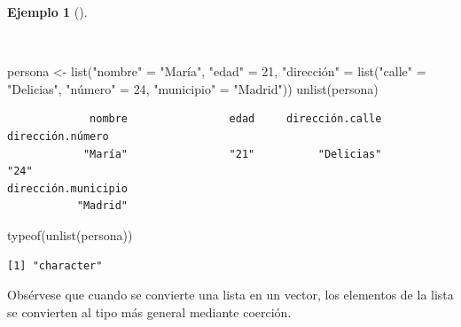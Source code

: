 \documentclass[
  a4paper,
]{scrreport}
\newenvironment{Shaded}{\begin{snugshade}}{\end{snugshade}}
\newcommand{\DecValTok}[1]{\textcolor[rgb]{0.68,0.00,0.00}{#1}}
\newcommand{\FunctionTok}[1]{\textcolor[rgb]{0.28,0.35,0.67}{#1}}
\newcommand{\NormalTok}[1]{\textcolor[rgb]{0.00,0.23,0.31}{#1}}
\newcommand{\OtherTok}[1]{\textcolor[rgb]{0.00,0.23,0.31}{#1}}
\newcommand{\StringTok}[1]{\textcolor[rgb]{0.13,0.47,0.30}{#1}}
\theoremstyle{definition}
\theoremstyle{definition}
\newtheorem{example}{Ejemplo}[chapter]
\theoremstyle{remark}
\begin{document}
\begin{example}[]\protect\hypertarget{exm-aplanar-lista}{}\label{exm-aplanar-lista}

~

\begin{Shaded}
\begin{Highlighting}[]
\NormalTok{persona }\OtherTok{\textless{}{-}} \FunctionTok{list}\NormalTok{(}\StringTok{"nombre"} \OtherTok{=} \StringTok{"María"}\NormalTok{, }\StringTok{"edad"} \OtherTok{=} \DecValTok{21}\NormalTok{, }\StringTok{"dirección"} \OtherTok{=} \FunctionTok{list}\NormalTok{(}\StringTok{"calle"} \OtherTok{=} \StringTok{"Delicias"}\NormalTok{, }\StringTok{"número"} \OtherTok{=} \DecValTok{24}\NormalTok{, }\StringTok{"municipio"} \OtherTok{=} \StringTok{"Madrid"}\NormalTok{))}
\FunctionTok{unlist}\NormalTok{(persona)}
\end{Highlighting}
\end{Shaded}

\begin{verbatim}
             nombre                edad     dirección.calle    dirección.número 
            "María"                "21"          "Delicias"                "24" 
dirección.municipio 
           "Madrid" 
\end{verbatim}

\begin{Shaded}
\begin{Highlighting}[]
\FunctionTok{typeof}\NormalTok{(}\FunctionTok{unlist}\NormalTok{(persona))}
\end{Highlighting}
\end{Shaded}

\begin{verbatim}
[1] "character"
\end{verbatim}

\end{example}

\begin{tcolorbox}[enhanced jigsaw, colbacktitle=quarto-callout-warning-color!10!white, breakable, opacitybacktitle=0.6, left=2mm, opacityback=0, leftrule=.75mm, colframe=quarto-callout-warning-color-frame, bottomrule=.15mm, toprule=.15mm, toptitle=1mm, colback=white, titlerule=0mm, title=\textcolor{quarto-callout-warning-color}{\faExclamationTriangle}\hspace{0.5em}{Advertencia}, rightrule=.15mm, arc=.35mm, bottomtitle=1mm, coltitle=black]

Obsérvese que cuando se convierte una lista en un vector, los elementos
de la lista se convierten al tipo más general mediante coerción.

\end{tcolorbox}
\end{document}
